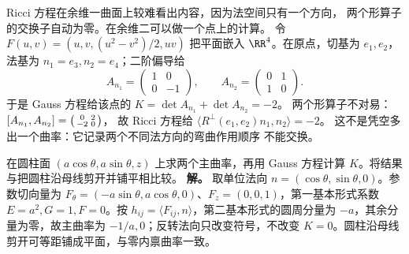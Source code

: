Ricci 方程在余维一曲面上较难看出内容，因为法空间只有一个方向，
两个形算子的交换子自动为零。在余维二可以做一个点上的计算。
令 \(F(u,v)=(u,v,(u^2-v^2)/2,uv)\) 把平面嵌入
\(\RR^4\)。在原点，切基为 \(e_1,e_2\)，法基为
\(n_1=e_3,n_2=e_4\)；二阶偏导给
\[
A_{n_1}=
\begin{pmatrix}1&0\\0&-1\end{pmatrix},
\qquad
A_{n_2}=
\begin{pmatrix}0&1\\1&0\end{pmatrix}.
\]
于是 Gauss 方程给该点的
\(K=\det A_{n_1}+\det A_{n_2}=-2\)。
两个形算子不对易：
\([A_{n_1},A_{n_2}]=
\begin{psmallmatrix}0&2\\-2&0\end{psmallmatrix}\)，
故 Ricci 方程给
\(\langle R^\perp(e_1,e_2)n_1,n_2\rangle=-2\)。
这不是凭空多出一个曲率：它记录两个不同法方向的弯曲作用顺序
不能交换。



\par
\begin{workedexample}
在圆柱面 \((a\cos\theta,a\sin\theta,z)\) 上求两个主曲率，再用 Gauss 方程计算 \(K\)。将结果与把圆柱沿母线剪开并铺平相比较。
\textbf{解。} 取单位法向 \(n=(\cos\theta,\sin\theta,0)\)。参数切向量为 \(F_\theta=(-a\sin\theta,a\cos\theta,0)\)、\(F_z=(0,0,1)\)，第一基本形式系数 \(E=a^2,G=1,F=0\)。按 \(h_{ij}=\langle F_{ij},n\rangle\)，第二基本形式的圆周分量为 \(-a\)，其余分量为零，故主曲率为 \(-1/a,0\)；反转法向只改变符号，不改变 \(K=0\)。圆柱沿母线剪开可等距铺成平面，与零内禀曲率一致。
\end{workedexample}
\par
